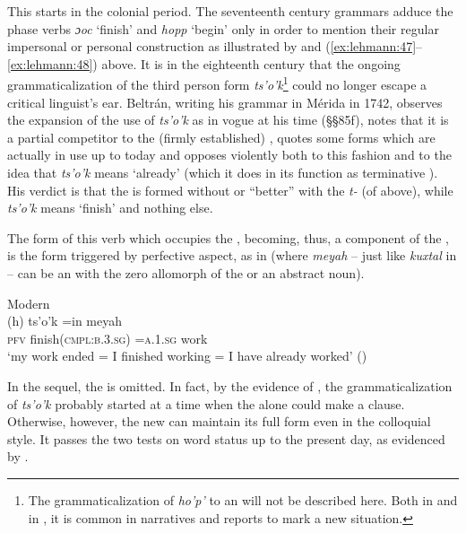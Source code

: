 \documentclass[output=paper]{langsci/langscibook}
\begin{document}
This  starts in the colonial period. The seventeenth century grammars adduce the phase verbs \textit{ɔoc} ‘finish’ and \textit{hopp} ‘begin’ only in order to mention their regular impersonal or personal construction as illustrated by  and (\ref{ex:lehmann:47}–\ref{ex:lehmann:48}) above. It is in the eighteenth century that the ongoing grammaticalization of the third person  form \textit{ts’o’k}\footnote{The grammaticalization of \textit{ho'p'} to an  will not be described here. Both in  and in  \citep[105]{Hofling1991}, it is common in narratives and reports to mark a new situation.} could no longer escape a critical linguist’s ear. Beltrán, writing his grammar in Mérida in 1742, observes the expansion of the use of \textit{ts’o’k} as  in vogue at his time (§§85f), notes that it is a partial competitor to the (firmly established) , quotes some  forms which are actually in use up to today and opposes violently both to this fashion and to the idea that \textit{ts’o’k} means ‘already’ (which it does in its function as terminative ). His verdict is that the  is formed without  or “better” with the  \textit{t-} (of  above), while \textit{ts’o’k} means ‘finish’ and nothing else.

The form of this verb which occupies the , becoming, thus, a component of the , is the  form triggered by perfective aspect, as in  (where \textit{meyah} – just like \textit{kuxtal} in  – can be an  with the zero allomorph of the  or an abstract noun).


\ea\label{ex:lehmann:51}
Modern  \\
\gll       (h)  ts’o’k            =in      meyah\\
  \textsc{pfv}  finish(\textsc{cmpl:b.3.sg)} \textsc{=a.1.sg}    work\\
\glt ‘my work ended = I finished working = I have already worked’ (\citealt[84]{BriceñoChel2000terminar})
\z



In the sequel, the   is omitted. In fact, by the evidence of , the grammaticalization of \textit{ts’o’k} probably started at a time when the  alone could make a  clause. Otherwise, however, the new  can maintain its full form even in the colloquial style. It passes the two tests on word status up to the present day, as evidenced by .
\end{document}

